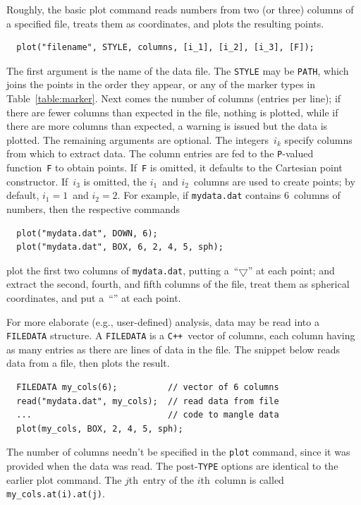 \documentclass[12pt]{report}
\newcommand{\code}[1]{\texttt{#1}}
\newcommand{\filename}[1]{\texttt{#1}}
\newcommand{\CXX}{\code{C++}}
\begin{document}
Roughly, the basic plot command reads numbers from two (or three)
columns of a specified file, treats them as coordinates, and plots the
resulting points.
\begin{verbatim}
  plot("filename", STYLE, columns, [i_1], [i_2], [i_3], [F]);
\end{verbatim}
The first argument is the name of the data file. The \code{STYLE} may
be \code{PATH}, which joins the points in the order they appear, or
any of the marker types in
Table~\ref{table:marker}.  Next comes the number of columns (entries
per line); if there are fewer columns than expected in the file,
nothing is plotted, while if there are more columns than expected, a
warning is issued but the data is plotted.  The remaining arguments
are optional. The integers~$i_k$ specify columns from which to extract
data. The column entries are fed to the \code{P}-valued
function~\code{F} to obtain points. If~\code{F} is omitted, it
defaults to the Cartesian point constructor. If~$i_3$ is omitted, the
$i_1$~and $i_2$~columns are used to create points; by default,
$i_1=1$~and $i_2=2$. For example, if \filename{mydata.dat} contains
6~columns of numbers, then the respective commands
\begin{verbatim}
  plot("mydata.dat", DOWN, 6);
  plot("mydata.dat", BOX, 6, 2, 4, 5, sph);
\end{verbatim}
plot the first two columns of \filename{mydata.dat}, putting
a~``$\bigtriangledown$'' at each point; and extract the second,
fourth, and fifth columns of the file, treat them as spherical
coordinates, and put a~``'' at each point.

For more elaborate (e.g., user-defined) analysis, data may be read
into a \code{FILEDATA} structure. A \code{FILEDATA} is a
\CXX~vector of columns, each column having as many entries as there
are lines of data in the file. The snippet below reads data from a
file, then plots the result.
\begin{verbatim}
  FILEDATA my_cols(6);          // vector of 6 columns
  read("mydata.dat", my_cols);  // read data from file
  ...                           // code to mangle data
  plot(my_cols, BOX, 2, 4, 5, sph);
\end{verbatim}
The number of columns needn't be specified in the \code{plot} command,
since it was provided when the data was read.  The post-\code{TYPE}
options are identical to the earlier plot command.  The $j$th~entry of
the $i$th~column is called \code{my\_cols.at(i).at(j)}.
\end{document}
